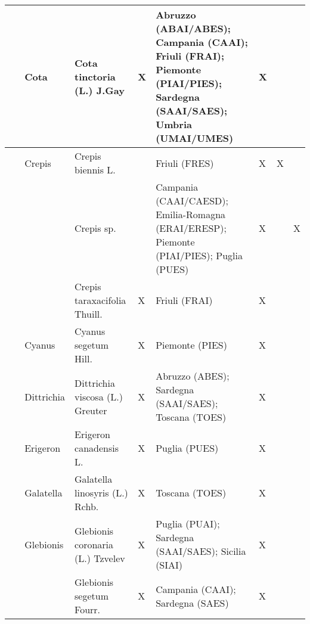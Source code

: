 \documentclass[main.tex]{subfiles}
\begin{document}
    \clearpage
        
        \begin{table}[!ht]
        \centering
    \begin{tabular}[\footnotesize]{|p{2.2cm}|p{2.2cm}|p{2.2cm}|p{1.1cm}|p{1.6cm}|p{0.8cm}|p{1cm}|p{0.8cm}|}
    \hline
        ~ & Cota & Cota tinctoria (L.) J.Gay & X & Abruzzo (ABAI/ABES); Campania (CAAI); Friuli (FRAI); Piemonte (PIAI/PIES); Sardegna (SAAI/SAES); Umbria (UMAI/UMES) & X & ~ & ~ \\ \hline
        ~ & Crepis & Crepis biennis L. & ~ & Friuli (FRES) & X & X & ~ \\ \hline
        ~ & ~ & Crepis sp. & ~ & Campania (CAAI/CAESD); Emilia-Romagna (ERAI/ERESP); Piemonte (PIAI/PIES); Puglia (PUES) & X & ~ & X \\ \hline
        ~ & ~ & Crepis taraxacifolia Thuill. & X & Friuli (FRAI) & X & ~ & ~ \\ \hline
        ~ & Cyanus & Cyanus segetum Hill. & X & Piemonte (PIES) & X & ~ & ~ \\ \hline
        ~ & Dittrichia & Dittrichia viscosa (L.) Greuter & X & Abruzzo (ABES); Sardegna (SAAI/SAES); Toscana (TOES) & X & ~ & ~ \\ \hline
        ~ & Erigeron  & Erigeron canadensis L. & X & Puglia (PUES) & X & ~ & ~ \\ \hline
        ~ & Galatella & Galatella linosyris (L.) Rchb. & X & Toscana (TOES) & X & ~ & ~ \\ \hline
        ~ & Glebionis & Glebionis coronaria (L.) Tzvelev & X & Puglia (PUAI); Sardegna (SAAI/SAES); Sicilia (SIAI) & X & ~ & ~ \\ \hline
        ~ & ~ & Glebionis segetum Fourr. & X & Campania (CAAI); Sardegna (SAES) & X & ~ & ~ \\ \hline
    \end{tabular}
    \end{table}
    
    \clearpage
        
\end{document}
